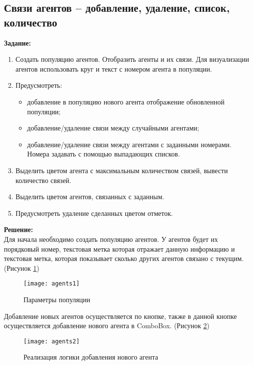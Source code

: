 \subsection*{Связи агентов -- добавление, удаление, список, количество}

\textbf{Задание:}\\
\begin{enumerate}[topsep=0pt,itemsep=-1ex,partopsep=1ex,parsep=1ex]
	\item Создать популяцию агентов. Отобразить агенты и их связи. Для визуализации агентов
	использовать круг и текст с номером агента в популяции.
	\item Предусмотреть:
	\begin{itemize}[topsep=0pt,itemsep=-1ex,partopsep=1ex,parsep=1ex]
		\item добавление в популяцию нового агента отображение обновленной популяции;
		\item добавление/удаление связи между случайными агентами;
		\item добавление/удаление связи между агентами с заданными номерами. Номера задавать с помощью выпадающих списков.
	\end{itemize}
	\item Выделить цветом агента с максимальным количеством связей, вывести количество связей.
	\item Выделить цветом агентов, связанных с заданным.
	\item Предусмотреть удаление сделанных цветом отметок.\\
\end{enumerate}

\textbf{Решение:}\\
Для начала необходимо создать популяцию агентов. У агентов будет их порядковый номер, текстовая метка которая отражает данную информацию и текстовая метка, которая показывает сколько других агентов связано с текущим. (Рисунок \ref{fig:agents1})
\begin{figure}[h]
	\centering \texttt{[image: agents1]}
	\caption{Параметры популяции}
	\label{fig:agents1}
\end{figure}

Добавление новых агентов осуществляется по кнопке, также в данной кнопке осуществляется добавление нового агента в ComboBox. (Рисунок \ref{fig:agents2})
\begin{figure}[h]
	\centering \texttt{[image: agents2]}
	\caption{Реализация логики добавления нового агента}
	\label{fig:agents2}
\end{figure}

